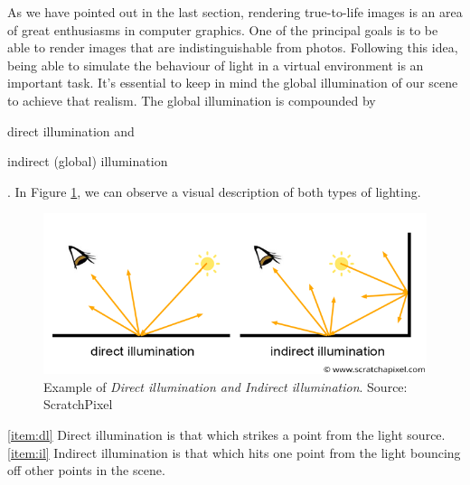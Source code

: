 \documentclass[titlepage,12pt]{report}
\begin{document}
As we have pointed out in the last section, rendering true-to-life images is an area of great enthusiasms in computer graphics. One of the principal goals is to be able to render images that are indistinguishable from photos. Following this idea, being able to simulate the behaviour of light in a virtual environment is an important task. It's essential to keep in mind the global illumination of our scene to achieve that realism. The global illumination is compounded by \begin{enumerate*}[label=\roman*)] \item direct illumination \label{item:dl} and \item indirect (global) illumination \label{item:il} \end{enumerate*}. In Figure \ref{globalil}, we can observe a visual description of both types of lighting.

\begin{figure}[!ht]
	\centering
	\includegraphics[scale=0.45]{media/shad2-globalillum3.png}
	\caption{Example of \textit{Direct illumination and Indirect illumination}. Source: ScratchPixel}
	\label{globalil}
\end{figure}

\ref{item:dl} Direct illumination is that which strikes a point from the light source.\\
\ref{item:il} Indirect illumination is that which hits one point from the light bouncing off other points in the scene.
\end{document}
